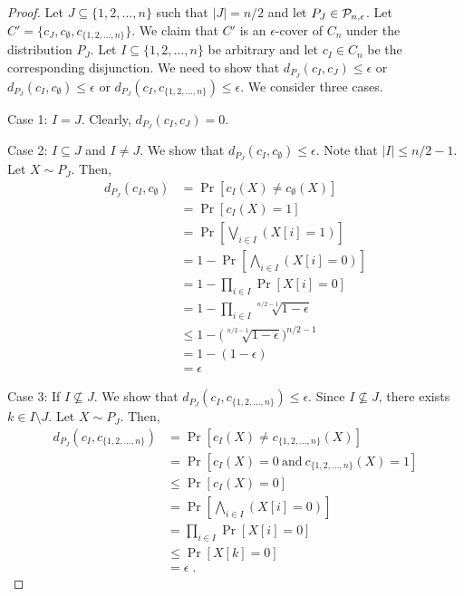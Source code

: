 \begin{proof}
Let $J \subseteq \{1,2,\dots,n\}$ such that $|J| = n/2$ and let $P_J \in \P_{n,\epsilon}$.
Let $C' = \{c_J, c_\emptyset, c_{\{1,2,\dots,n\}}\}$.
We claim that $C'$ is an $\epsilon$-cover of $C_n$ under the distribution $P_J$.
Let $I \subseteq \{1,2,\dots,n\}$ be arbitrary and let $c_I \in C_n$ be the
corresponding disjunction. We need to show that $d_{P_J}(c_I, c_J) \le \epsilon$
or $d_{P_J}(c_I, c_\emptyset) \le \epsilon$ or $d_{P_J}(c_I,
c_{\{1,2,\dots,n\}}) \le \epsilon$. We consider three cases.

Case 1: $I = J$. Clearly, $d_{P_J}(c_I, c_J) = 0$.

Case 2: $I \subseteq J$ and $I \neq J$. We show that $d_{P_J}(c_I, c_\emptyset) \le \epsilon$.
Note that $|I| \le n/2 - 1$. Let $X \sim P_J$. Then,
\begin{align*}
d_{P_J}(c_I, c_\emptyset)
& = \Pr[c_I(X) \neq c_\emptyset(X)] \\
& = \Pr[c_I(X) = 1] \\
& = \Pr \left[ \bigvee_{i \in I} (X[i] = 1) \right] \\
& = 1 - \Pr \left[ \bigwedge_{i \in I} (X[i] = 0) \right] \\
& = 1 - \prod_{i \in I} \Pr \left[ X[i] = 0 \right] \\
& = 1 - \prod_{i \in I} \sqrt[n/2 - 1]{1 - \epsilon} \\
& \le 1 - \bigg( \sqrt[n/2-1]{1 - \epsilon} \bigg)^{n/2-1} \\
& = 1 - (1 - \epsilon) \\
& = \epsilon
\end{align*}

Case 3: If $I \not \subseteq J$. We show that $d_{P_J}(c_I, c_{\{1,2,\dots,n\}}) \le \epsilon$.
Since $I \not \subseteq J$, there exists $k \in I \setminus J$. Let $X \sim P_J$. Then,
\begin{align*}
d_{P_J}(c_I, c_{\{1,2,\dots,n\}})
& = \Pr [c_I(X) \neq c_{\{1,2,\dots,n\}}(X)] \\
& = \Pr [c_I(X) = 0 \ \text{and} \ c_{\{1,2,\dots,n\}}(X) = 1] \\
& \le  \Pr [c_I(X) = 0 ] \\
& = \Pr \left[ \bigwedge_{i \in I} (X[i] = 0) \right] \\
& = \prod_{i \in I} \Pr \left[ X[i] = 0 \right] \\
& \le \Pr \left[ X[k] = 0 \right] \\
& = \epsilon \; .
\end{align*}
\end{proof}

